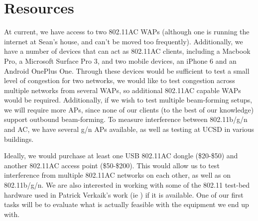 \section{Resources}

At current, we have access to two 802.11AC WAPs (although one is
running the internet at Sean's house, and can't be moved too
frequently). Additionally, we have a number of devices that can act as
802.11AC clients, including a Macbook Pro, a Microsoft Surface Pro 3,
and two mobile devices, an iPhone 6 and an Android OnePlus
One. Through these devices would be sufficient to test a small level
of congestion for two networks, we would like to test congestion
across multiple networks from several WAPs, so additional 802.11AC
capable WAPs would be required. Additionally, if we wish to test
multiple beam-forming setups, we will require more APs, since none of
our clients (to the best of our knowledge) support outbound
beam-forming. To measure interference between 802.11b/g/n and AC, we
have several g/n APs available, as well as testing at UCSD in various
buildings.

Ideally, we would purchase at least one USB 802.11AC dongle
(\$20-\$50) and another 802.11AC access point (\$50-\$200). This would
allow us to test interference from multiple 802.11AC networks on each
other, as well as on 802.11b/g/n. We are also interested in working
with some of the 802.11 test-bed hardware used in Patrick Verkaik's
work (ie \cite{kandula2009detailed}) if it is available. One of our
first tasks will be to evaluate what is actually feasible with the
equipment we end up with.
